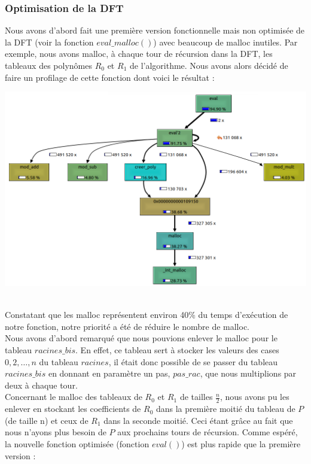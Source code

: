 \documentclass[12pt, a4paper]{article}
\begin{document}
\subsubsection{Optimisation de la DFT}
Nous avons d'abord fait une première version fonctionnelle mais non optimisée de la DFT (voir la fonction $eval\_malloc()$) avec beaucoup de malloc inutiles. Par exemple, nous avons malloc, à chaque tour de récursion dans la DFT, les tableaux des polynômes $R_0$ et $R_1$ de l'algorithme. Nous avons alors décidé de faire un profilage de cette fonction dont voici le résultat : \\
\centerline{\includegraphics[scale=0.65]{profiler_eval_malloc}}
{}
\ \\
\indent Constatant que les malloc représentent environ 40\% du temps d'exécution de notre fonction, notre priorité a été de réduire le nombre de malloc.  \\
\indent Nous avons d'abord remarqué que nous pouvions enlever le malloc pour le tableau \linebreak $racines\_bis$. En effet, ce tableau sert à stocker les valeurs des cases $0,2,\dots,n$ du tableau $racines$, il était donc possible de se passer du tableau $racines\_bis$ en donnant en paramètre un pas, $pas\_rac$, que nous multiplions par deux à chaque tour. \\
\indent Concernant le malloc des tableaux de $R_0$ et $R_1$ de tailles $\frac{n}{2}$, nous avons pu les enlever en stockant les coefficients de $R_0$ dans la première moitié du tableau de $P$ (de taille n) et ceux de $R_1$ dans la seconde moitié. Ceci étant grâce au fait que nous n'ayons plus besoin de $P$ aux prochains tours de récursion.
Comme espéré, la nouvelle fonction optimisée (fonction $eval()$) est plus rapide que la première version :
\end{document}
